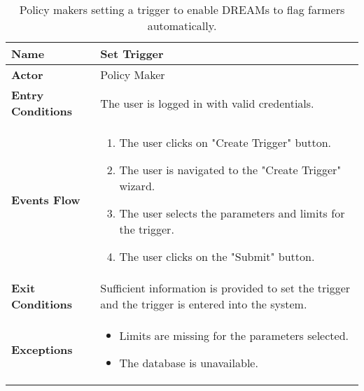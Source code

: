 
\begin{table}
\centering
\small
\caption{\label{tab:addOne{table_counter}}Policy makers setting a trigger to enable DREAMs to flag farmers automatically.}
\renewcommand{\arraystretch}{1.25}
\begin{tabular}{|l|>{\raggedright\arraybackslash}m{12cm}|}

    \hline
    \textbf{Name} & Set Trigger\\
    \hline
   	\textbf{Actor} & Policy Maker\\
    \hline
    \textbf{Entry Conditions} & The user is logged in with valid credentials.\\
    \hline
    \textbf{Events Flow} & 
    \begin{enumerate}
	    \item The user clicks on "Create Trigger" button.
    	\item The user is navigated to the "Create Trigger" wizard.
    	\item The user selects the parameters and limits for the trigger.
    	\item The user clicks on the "Submit" button.
    \end{enumerate} \\ \hline
    \textbf{Exit Conditions} & Sufficient information is provided to set the trigger and the trigger is entered into the system.\\
    \hline
    \textbf{Exceptions} & \begin{itemize}
    	\item Limits are missing for the parameters selected.
    	\item The database is unavailable.
    \end{itemize}\\
    \hline
\end{tabular}
\end{table}